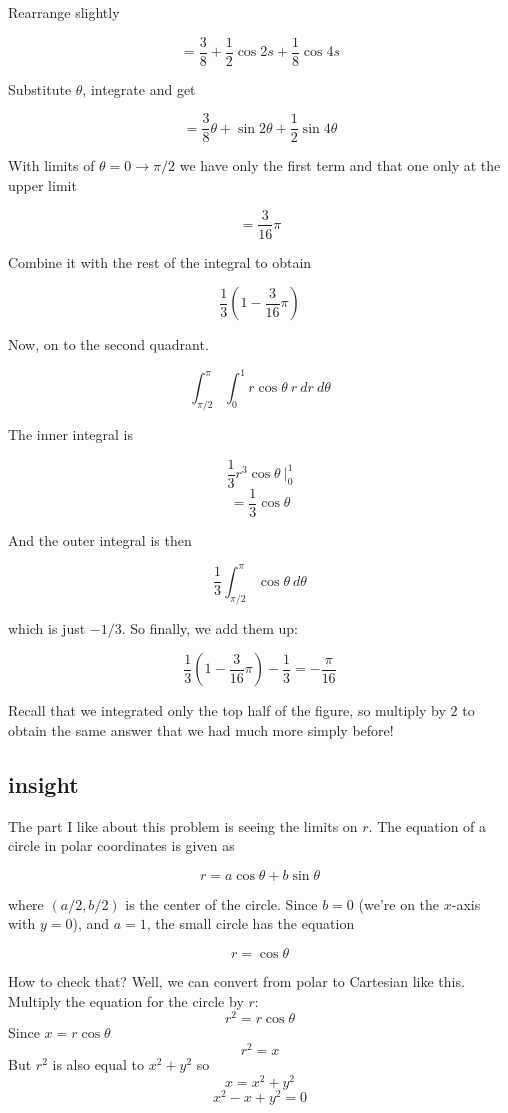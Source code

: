 \documentclass[11pt, oneside]{article}
\begin{document}
Rearrange slightly

\[ = \frac{3}{8} + \frac{1}{2} \cos 2s + \frac{1}{8} \cos 4s \]

Substitute $\theta$, integrate and get 

\[ = \frac{3}{8}\theta + \sin 2 \theta + \frac{1}{2} \sin 4 \theta \]

With limits of $\theta = 0 \rightarrow \pi/2$ we have only the first term and that one only at the upper limit

\[  = \frac{3}{16} \pi \]

Combine it with the rest of the integral to obtain

\[ \frac{1}{3}(1 - \frac{3}{16} \pi ) \]

Now, on to the second quadrant.

\[ \int_{\pi/2}^{\pi} \int_{0}^{1} r \cos \theta \ r \ dr \ d \theta \]

The inner integral is 

\[ \frac{1}{3} r^3 \cos \theta \ \bigg |_0^1  \]
\[ = \frac{1}{3} \cos \theta \]

And the outer integral is then

\[   \frac{1}{3}  \int_{\pi/2}^{\pi} \cos \theta \ d \theta \]

which is just $-1/3$.  So finally, we add them up:

\[ \frac{1}{3}(1 - \frac{3}{16} \pi ) - \frac{1}{3} = - \frac{\pi}{16} \]

Recall that we integrated only the top half of the figure, so multiply by $2$ to obtain the same answer that we had much more simply before!

\subsection*{insight}

The part I like about this problem is seeing the limits on $r$.  The equation of a circle in polar coordinates is given as

\[ r = a \cos \theta + b \sin \theta \]

where $(a/2,b/2)$ is the center of the circle.  Since $b = 0$ (we're on the $x$-axis with $y = 0$), and $a = 1$, the small circle has the equation

\[ r = \cos \theta \]

How to check that?  Well, we can convert from polar to Cartesian like this.  Multiply the equation for the circle by $r$:
\[ r^2 = r \cos \theta \]
Since $x = r \cos \theta$
\[ r^2 = x \]
But $r^2$ is also equal to $x^2 + y^2$ so
\[ x = x^2 + y^2 \]
\[ x^2 - x + y^2 = 0 \]
 
\end{document}
